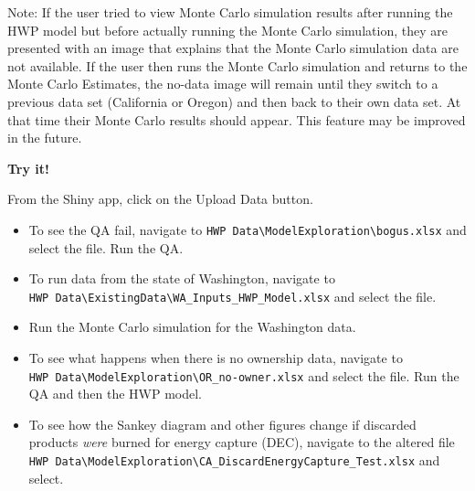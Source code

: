 \documentclass[
  openany]{book}
\providecommand{\tightlist}{%
  \setlength{\itemsep}{0pt}\setlength{\parskip}{0pt}}
\begin{document}
Note: If the user tried to view Monte Carlo simulation results after
running the HWP model but before actually running the Monte Carlo
simulation, they are presented with an image that explains that the
Monte Carlo simulation data are not available. If the user then runs the
Monte Carlo simulation and returns to the Monte Carlo Estimates, the
no-data image will remain until they switch to a previous data set
(California or Oregon) and then back to their own data set. At that time
their Monte Carlo results should appear. This feature may be improved in
the future.

\begin{greybox}

\begin{minipage}{.85\linewidth}

\begin{center}
\textbf{Try it!}

\end{center}

From the Shiny app, click on the Upload Data button.

\begin{itemize}
\tightlist
\item
  To see the QA fail, navigate to
  \texttt{HWP\ Data\textbackslash{}ModelExploration\textbackslash{}bogus.xlsx}
  and select the file. Run the QA.\\
\item
  To run data from the state of Washington, navigate to
  \texttt{HWP\ Data\textbackslash{}ExistingData\textbackslash{}WA\_Inputs\_HWP\_Model.xlsx}
  and select the file.\\
\item
  Run the Monte Carlo simulation for the Washington data.
\item
  To see what happens when there is no ownership data, navigate to
  \texttt{HWP\ Data\textbackslash{}ModelExploration\textbackslash{}OR\_no-owner.xlsx}
  and select the file. Run the QA and then the HWP model.\\
\item
  To see how the Sankey diagram and other figures change if discarded
  products \emph{were} burned for energy capture (DEC), navigate to the
  altered file
  \texttt{HWP\ Data\textbackslash{}ModelExploration\textbackslash{}CA\_DiscardEnergyCapture\_Test.xlsx}
  and select.
\end{itemize}

\end{minipage}

\end{greybox}
\end{document}
